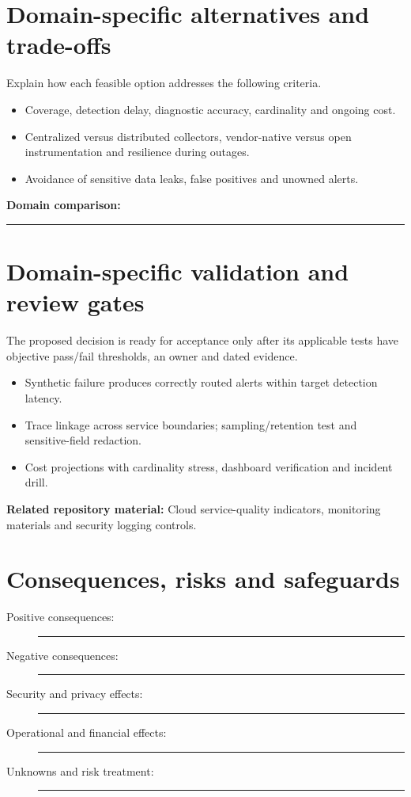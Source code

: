 \documentclass[11pt,letterpaper]{article}
\newcommand{\BlankResponse}{\rule[-0.4em]{0pt}{2em}\rule{0.65\linewidth}{0.4pt}}
\begin{document}
\section{Domain-specific alternatives and trade-offs}
Explain how each feasible option addresses the following criteria.
\begin{itemize}
\item Coverage, detection delay, diagnostic accuracy, cardinality and ongoing cost.
\item Centralized versus distributed collectors, vendor-native versus open instrumentation and resilience during outages.
\item Avoidance of sensitive data leaks, false positives and unowned alerts.
\end{itemize}
\noindent\textbf{Domain comparison:} \BlankResponse
\section{Domain-specific validation and review gates}
The proposed decision is ready for acceptance only after its applicable
tests have objective pass/fail thresholds, an owner and dated evidence.
\begin{itemize}
\item Synthetic failure produces correctly routed alerts within target detection latency.
\item Trace linkage across service boundaries; sampling/retention test and sensitive-field redaction.
\item Cost projections with cardinality stress, dashboard verification and incident drill.
\end{itemize}
\noindent\textbf{Related repository material:} Cloud service-quality indicators, monitoring materials and security logging controls.

\section{Consequences, risks and safeguards}
\begin{description}
\item[Positive consequences:] \BlankResponse
\item[Negative consequences:] \BlankResponse
\item[Security and privacy effects:] \BlankResponse
\item[Operational and financial effects:] \BlankResponse
\item[Unknowns and risk treatment:] \BlankResponse
\end{description}
\end{document}
